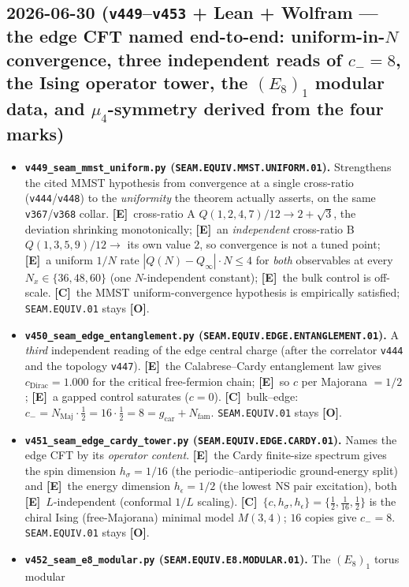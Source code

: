 \documentclass[11pt]{article}
\providecommand{\mE}{\textbf{[E]}}\providecommand{\mC}{\textbf{[C]}}
\providecommand{\mO}{\textbf{[O]}}\providecommand{\mX}{\textbf{[X]}}
\providecommand{\gcar}{g_{\mathrm{car}}}\providecommand{\Nfam}{N_{\mathrm{fam}}}
\begin{document}
\subsection*{2026-06-30 (\texttt{v449}--\texttt{v453} + Lean + Wolfram --- the edge CFT named end-to-end: uniform-in-$N$ convergence, three independent reads of $c_-{=}8$, the Ising operator tower, the $(E_8)_1$ modular data, and $\mu_4$-symmetry derived from the four marks)}
\begin{itemize}
\item \textbf{\texttt{v449\_seam\_mmst\_uniform.py} (\texttt{SEAM.EQUIV.MMST.UNIFORM.01}).} Strengthens the cited MMST
hypothesis from convergence at a single cross-ratio (\texttt{v444}/\texttt{v448}) to the \emph{uniformity} the theorem
actually asserts, on the same \texttt{v367}/\texttt{v368} collar. \mE\ cross-ratio A $Q(1,2,4,7)/12\to2{+}\sqrt3$, the
deviation shrinking monotonically; \mE\ an \emph{independent} cross-ratio B $Q(1,3,5,9)/12\to$ its own value $2$, so
convergence is not a tuned point; \mE\ a uniform $1/N$ rate $|Q(N){-}Q_\infty|\cdot N\le4$ for \emph{both} observables
at every $N_x\in\{36,48,60\}$ (one $N$-independent constant); \mE\ the bulk control is off-scale. \mC\ the MMST
uniform-convergence hypothesis is empirically satisfied; \texttt{SEAM.EQUIV.01} stays \mO.
\item \textbf{\texttt{v450\_seam\_edge\_entanglement.py} (\texttt{SEAM.EQUIV.EDGE.ENTANGLEMENT.01}).} A \emph{third}
independent reading of the edge central charge (after the correlator \texttt{v444} and the topology \texttt{v447}).
\mE\ the Calabrese--Cardy entanglement law gives $c_{\mathrm{Dirac}}{=}1.000$ for the critical free-fermion chain;
\mE\ so $c$ per Majorana $=1/2$; \mE\ a gapped control saturates ($c{=}0$). \mC\ bulk--edge:
$c_-{=}N_{\mathrm{Maj}}\cdot\tfrac12{=}16\cdot\tfrac12{=}8{=}\gcar{+}\Nfam$. \texttt{SEAM.EQUIV.01} stays \mO.
\item \textbf{\texttt{v451\_seam\_edge\_cardy\_tower.py} (\texttt{SEAM.EQUIV.EDGE.CARDY.01}).} Names the edge CFT by its
\emph{operator content}. \mE\ the Cardy finite-size spectrum gives the spin dimension $h_\sigma{=}1/16$ (the
periodic--antiperiodic ground-energy split) and \mE\ the energy dimension $h_\epsilon{=}1/2$ (the lowest NS pair
excitation), both \mE\ $L$-independent (conformal $1/L$ scaling). \mC\ $\{c,h_\sigma,h_\epsilon\}{=}\{\tfrac12,
\tfrac1{16},\tfrac12\}$ is the chiral Ising (free-Majorana) minimal model $M(3,4)$; $16$ copies give
$c_-{=}8$. \texttt{SEAM.EQUIV.01} stays \mO.
\item \textbf{\texttt{v452\_seam\_e8\_modular.py} (\texttt{SEAM.EQUIV.E8.MODULAR.01}).} The $(E_8)_1$ torus modular

\end{itemize}
\end{document}
